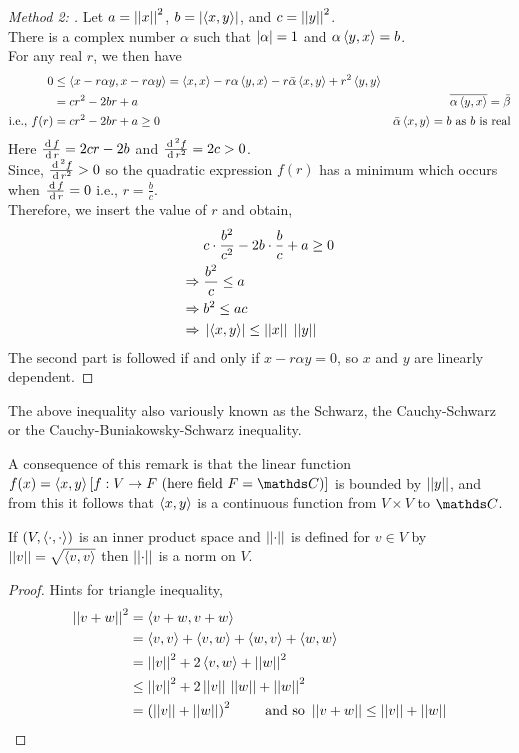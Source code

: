 \documentclass[../main-sheet.tex]{subfiles}
\begin{document}
\begin{proof}[Method 2: ]
    Let $ a=\left\vert\left\vert x\right\vert\right\vert^2 $, $ b=\left\vert\left<x,y\right>\right\vert $, and $ c=\left\vert\left\vert y\right\vert\right\vert^2 $.\\
    There is a complex number $ \alpha $ such that $ \left\vert\alpha\right\vert=1 $ and $ \alpha\left<y,x\right>=b $.\\
    For any real $ r $, we then have
    \begin{align*}
        0&\leq \left<x-r \alpha y, x-r\alpha y\right>=\left<x,x\right>-r\alpha \left<y,x\right>-r\bar{\alpha}\left<x,y\right>+r^2\left<y,y\right>\\
        &=cr^2-2br+a & \overline{\alpha \left<y,x\right>}=\bar{\beta}\\
        \text{i.e., } f(r)&= cr^2-2br+a \geq 0& \bar{\alpha} \left<x,y\right>=b\text{ as $ b $ is real}
    \end{align*}
    Here $ \frac{\,\mathrm{d}\, f}{\,\mathrm{d}\, r} =2cr-2b$ and $ \frac{\,\mathrm{d}\,^2 f}{\,\mathrm{d}\, r^2}=2c >0 $.\\
    Since, $ \frac{\,\mathrm{d}\,^2 f}{\,\mathrm{d}\, r^2}>0 $ so the quadratic expression $ f(r) $ has a minimum which occurs when $ \frac{\,\mathrm{d}\, f}{\,\mathrm{d}\, r}=0 $ i.e., $ r=\frac{b}{c} $.\\
    Therefore, we insert the value of $ r $ and obtain,
    \begin{align*}
        & c\cdot \frac{b^2}{c^2}-2b\cdot \frac{b}{c}+a\geq 0\\
        \Rightarrow\; &\frac{b^2}{c}\leq a\\
        \Rightarrow\; & b^2\leq ac\\
        \Rightarrow\; & \left\vert\left<x,y\right>\right\vert \leq \left\vert\left\vert x\right\vert\right\vert\;\left\vert\left\vert y\right\vert\right\vert
    \end{align*}
    The second part is followed if and only if $ x-r\alpha y=0 $, so $ x $ and $ y $ are linearly dependent.
\end{proof}
\begin{note}
    The above inequality also variously known as the Schwarz, the Cauchy-Schwarz or the Cauchy-Buniakowsky-Schwarz inequality.
\end{note}
\begin{rem}
    A consequence of this remark is that the linear function $ f(x)=\seq{x,y}[f:V\to F \text{ (here field }F=\C)] $ is bounded by $ \left\vert\left\vert y\right\vert\right\vert $, and from this it follows that $ \left<x,y\right> $ is a continuous function from $ V\times V $ to $ \C $.
\end{rem}
\begin{thm}
    If $ (V,\left<\cdot,\cdot\right>) $ is an inner product space and $ \left\vert\left\vert\cdot\right\vert\right\vert $ is defined for $ v\in V $ by $ \left\vert\left\vert v\right\vert\right\vert=\sqrt{\left<v,v\right>}  $ then $ \left\vert\left\vert\cdot\right\vert\right\vert  $ is a norm on $ V $.
\end{thm}
\begin{proof}
    Hints for triangle inequality,
    \begin{align*}
        \left\vert\left\vert v+w\right\vert\right\vert^2&=\left<v+w,v+w\right>\\
        &=\left<v,v\right>+\left<v,w\right>+\left<w,v\right>+\left<w,w\right>\\
        &=\left\vert\left\vert v\right\vert\right\vert^2+2\left<v,w\right>+\left\vert\left\vert w\right\vert\right\vert^2\\
        &\leq \left\vert\left\vert v\right\vert\right\vert^2+2\left\vert\left\vert v\right\vert\right\vert\,\left\vert\left\vert w\right\vert\right\vert+\left\vert\left\vert w\right\vert\right\vert^2\\
        &= \left( \left\vert\left\vert v\right\vert\right\vert+\left\vert\left\vert w\right\vert\right\vert\right) ^2 \qquad \text{ and so } \left\vert\left\vert v+w\right\vert\right\vert\leq \left\vert\left\vert v\right\vert\right\vert+\left\vert\left\vert w\right\vert\right\vert
    \end{align*}
\end{proof}
\end{document}

